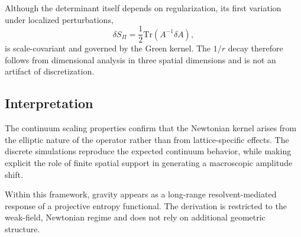     Although the determinant itself depends on regularization,
    its first variation under localized perturbations,
    \begin{equation}
      \delta S_\Pi = \frac12 \mathrm{Tr}(A^{-1}\delta A),
    \end{equation}
    is scale-covariant and governed by the Green kernel.
    The $1/r$ decay therefore follows from dimensional analysis
    in three spatial dimensions and is not an artifact of discretization.

  \subsection{Interpretation}

    The continuum scaling properties confirm that
    the Newtonian kernel arises from the elliptic nature
    of the operator rather than from lattice-specific effects.
    The discrete simulations reproduce the expected continuum behavior,
    while making explicit the role of finite spatial support
    in generating a macroscopic amplitude shift.

    Within this framework, gravity appears as a long-range
    resolvent-mediated response of a projective entropy functional.
    The derivation is restricted to the weak-field,
    Newtonian regime and does not rely on additional geometric structure.
